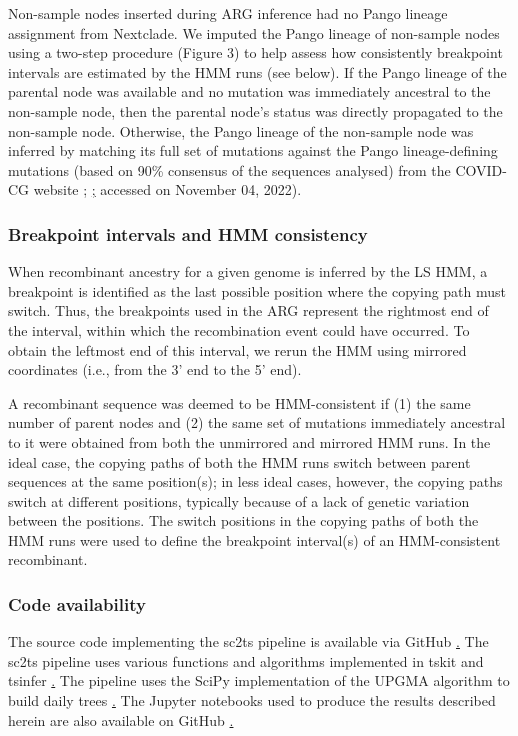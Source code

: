 \documentclass{article}
\begin{document}
Non-sample nodes inserted during ARG inference had no Pango lineage assignment
from Nextclade. We imputed the Pango lineage of non-sample nodes using a
two-step procedure (Figure 3) to help assess how consistently breakpoint
intervals are estimated by the HMM runs (see below). If the Pango lineage of
the parental node was available and no mutation was immediately ancestral to
the non-sample node, then the parental node’s status was directly propagated to
the non-sample node. Otherwise, the Pango lineage of the non-sample node was
inferred by matching its full set of mutations against the Pango
lineage-defining mutations (based on 90\% consensus of the sequences analysed)
from the COVID-CG website \cite{Chen2021-zc}; \href{https://covidcg.org/};
accessed on November 04, 2022).

\subsubsection{Breakpoint intervals and HMM consistency}

When recombinant ancestry for a given genome is inferred by the LS HMM, a
breakpoint is identified as the last possible position where the copying path
must switch. Thus, the breakpoints used in the ARG represent the rightmost end
of the interval, within which the recombination event could have occurred. To
obtain the leftmost end of this interval, we rerun the HMM using mirrored
coordinates (i.e., from the 3’ end to the 5’ end).

A recombinant sequence was deemed to be HMM-consistent if (1) the same number
of parent nodes and (2) the same set of mutations immediately ancestral to it
were obtained from both the unmirrored and mirrored HMM runs. In the ideal
case, the copying paths of both the HMM runs switch between parent sequences at
the same position(s); in less ideal cases, however, the copying paths switch at
different positions, typically because of a lack of genetic variation between
the positions. The switch positions in the copying paths of both the HMM runs
were used to define the breakpoint interval(s) of an HMM-consistent
recombinant.

\subsubsection{Code availability}

The source code implementing the sc2ts pipeline is available via GitHub
\href{https://github.com/jeromekelleher/sc2ts/}. The sc2ts pipeline uses
various functions and algorithms implemented in tskit and tsinfer
\href{https://github.com/tskit-dev/}. The pipeline uses the SciPy
implementation of the UPGMA algorithm to build daily trees
\href{https://docs.scipy.org/doc/scipy/reference/generated/scipy.cluster.hierarchy.average.html}.
The Jupyter notebooks used to produce the results described herein are also
available on GitHub \href{https://github.com/jeromekelleher/sc2ts-paper/}.
\end{document}
